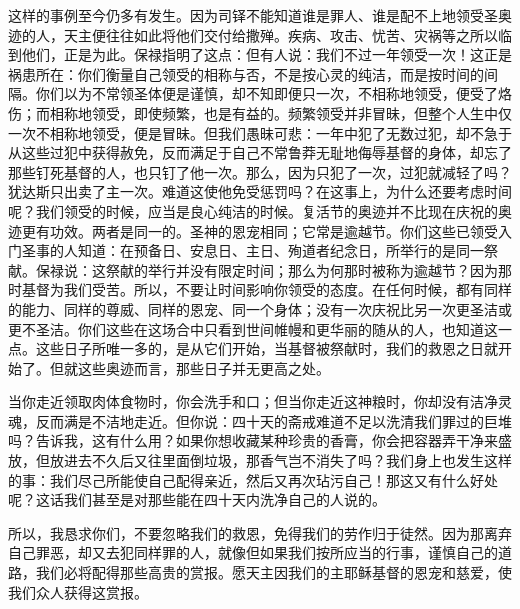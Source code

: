 这样的事例至今仍多有发生。因为司铎不能知道谁是罪人、谁是配不上地领受圣奥迹的人，天主便往往如此将他们交付给撒殚。疾病、攻击、忧苦、灾祸等之所以临到他们，正是为此。保禄指明了这点：但有人说：我们不过一年领受一次！这正是祸患所在：你们衡量自己领受的相称与否，不是按心灵的纯洁，而是按时间的间隔。你们以为不常领圣体便是谨慎，却不知即便只一次，不相称地领受，便受了烙伤；而相称地领受，即使频繁，也是有益的。频繁领受并非冒昧，但整个人生中仅一次不相称地领受，便是冒昧。但我们愚昧可悲：一年中犯了无数过犯，却不急于从这些过犯中获得赦免，反而满足于自己不常鲁莽无耻地侮辱基督的身体，却忘了那些钉死基督的人，也只钉了他一次。那么，因为只犯了一次，过犯就减轻了吗？犹达斯只出卖了主一次。难道这使他免受惩罚吗？在这事上，为什么还要考虑时间呢？我们领受的时候，应当是良心纯洁的时候。复活节的奥迹并不比现在庆祝的奥迹更有功效。两者是同一的。圣神的恩宠相同；它常是逾越节。你们这些已领受入门圣事的人知道：在预备日、安息日、主日、殉道者纪念日，所举行的是同一祭献。保禄说：这祭献的举行并没有限定时间；那么为何那时被称为逾越节？因为那时基督为我们受苦。所以，不要让时间影响你领受的态度。在任何时候，都有同样的能力、同样的尊威、同样的恩宠、同一个身体；没有一次庆祝比另一次更圣洁或更不圣洁。你们这些在这场合中只看到世间帷幔和更华丽的随从的人，也知道这一点。这些日子所唯一多的，是从它们开始，当基督被祭献时，我们的救恩之日就开始了。但就这些奥迹而言，那些日子并无更高之处。\par

当你走近领取肉体食物时，你会洗手和口；但当你走近这神粮时，你却没有洁净灵魂，反而满是不洁地走近。但你说：四十天的斋戒难道不足以洗清我们罪过的巨堆吗？告诉我，这有什么用？如果你想收藏某种珍贵的香膏，你会把容器弄干净来盛放，但放进去不久后又往里面倒垃圾，那香气岂不消失了吗？我们身上也发生这样的事：我们尽己所能使自己配得亲近，然后又再次玷污自己！那这又有什么好处呢？这话我们甚至是对那些能在四十天内洗净自己的人说的。\par

所以，我恳求你们，不要忽略我们的救恩，免得我们的劳作归于徒然。因为那离弃自己罪恶，却又去犯同样罪的人，就像但如果我们按所应当的行事，谨慎自己的道路，我们必将配得那些高贵的赏报。愿天主因我们的主耶稣基督的恩宠和慈爱，使我们众人获得这赏报。\par


